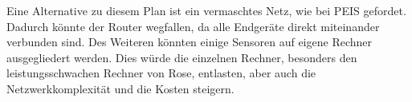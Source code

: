 Eine Alternative zu diesem Plan ist ein vermaschtes Netz, wie bei PEIS gefordet. Dadurch könnte der Router wegfallen, da alle Endgeräte direkt miteinander verbunden sind. Des Weiteren könnten einige Sensoren auf eigene Rechner ausgegliedert werden. Dies würde die einzelnen Rechner, besonders den leistungsschwachen Rechner von Rose, entlasten, aber auch die Netzwerkkomplexität und die Kosten steigern.